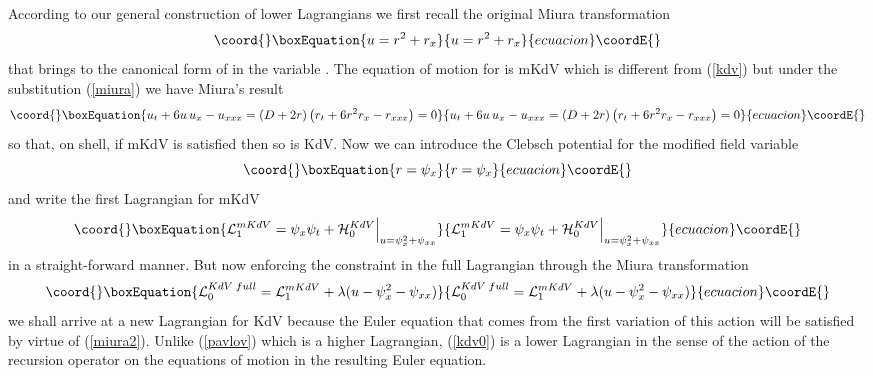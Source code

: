 \documentclass[a4paper,12pt]{article}
\begin{document}
According to our general construction of lower Lagrangians we
first recall the original Miura transformation
\begin{equation}\coord{}\boxEquation{
u = r^2 + r_{x} \label{miura}
}{
u = r^2 + r_{x} }{ecuacion}\coordE{}\end{equation}
that brings \coordHE{} to the canonical form of \coordHE{} in the variable
\coordHE{}. The equation of motion for \coordHE{} is mKdV which is different
from (\ref{kdv}) but under the substitution (\ref{miura}) we have
Miura's result
\begin{equation}\coord{}\boxEquation{
u_t + 6 u \, u_x - u_{xxx} = (D + 2 r ) \left(  r_t + 6 r^2 r_x -
r_{xxx} \right) =0 \label{miura2}
}{
u_t + 6 u \, u_x - u_{xxx} = (D + 2 r ) \left(  r_t + 6 r^2 r_x -
r_{xxx} \right) =0 }{ecuacion}\coordE{}\end{equation}
so that, on shell, if mKdV is satisfied then so is KdV. Now we can
introduce the Clebsch potential for the modified field variable
\begin{equation}\coord{}\boxEquation{
r = \psi_x
}{
r = \psi_x
}{ecuacion}\coordE{}\end{equation}
and write the first Lagrangian for mKdV
\begin{equation}\coord{}\boxEquation{
{\cal L}_1^{mKdV} = \psi_x \psi_t + {\cal
H}_0^{KdV}\Big|_{u=\psi_x^2+\psi_{xx} } \label{mkdvlag}
}{
{\cal L}_1^{mKdV} = \psi_x \psi_t + {\cal
H}_0^{KdV}\Big|_{u=\psi_x^2+\psi_{xx} } }{ecuacion}\coordE{}\end{equation}
in a straight-forward manner. But now enforcing the constraint in
the full Lagrangian through the Miura transformation
\begin{equation}\coord{}\boxEquation{
{\cal L}_{0}^{KdV \; full} = {\cal L}_1^{mKdV}  + \lambda ( u -
\psi_x^2 - \psi_{xx} ) \label{kdv0}
}{
{\cal L}_{0}^{KdV \; full} = {\cal L}_1^{mKdV}  + \lambda ( u -
\psi_x^2 - \psi_{xx} ) }{ecuacion}\coordE{}\end{equation}
we shall arrive at a new Lagrangian for KdV because the Euler
equation that comes from the first variation of this action will
be satisfied by virtue of (\ref{miura2}). Unlike (\ref{pavlov})
which is a higher Lagrangian, (\ref{kdv0}) is a lower Lagrangian
in the sense of the action of the recursion operator on the
equations of motion in the resulting Euler equation.
\end{document}
